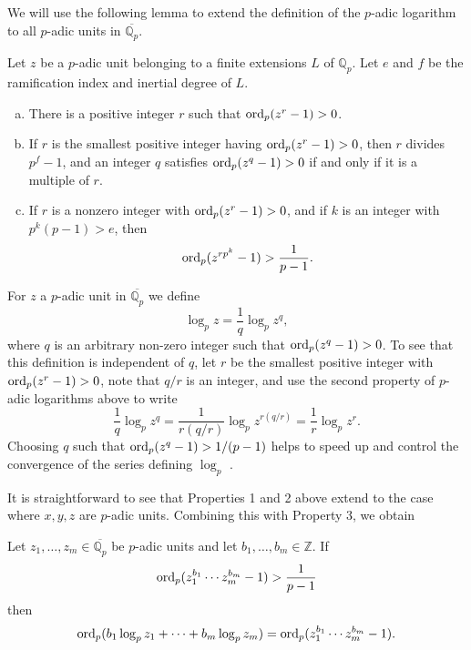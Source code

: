 We will use the following lemma to extend the definition of the $p$-adic logarithm to all $p$-adic units in $\overline{\mathbb{Q}_p}$. 
\begin{lemma} \label{lem: pAdicLogarithms}
Let $z$ be a $p$-adic unit belonging to a finite extensions $L$ of $\mathbb{Q}_p$. Let $e$ and $f$ be the ramification index and inertial degree of $L$. 
\begin{enumerate}[(a)]
\item There is a positive integer $r$ such that $\operatorname{ord}_p(z^r-1) >0$.
\item If $r$ is the smallest positive integer having $\operatorname{ord}_p(z^r-1) >0$, then $r$ divides $p^f-1$, and an integer $q$ satisfies $\operatorname{ord}_p(z^q-1) >0$ if and only if it is a multiple of $r$.
\item If $r$ is a nonzero integer with $\operatorname{ord}_p(z^r-1) >0$, and if $k$ is an integer with $p^k(p-1) > e$, then
\[\operatorname{ord}_p(z^{rp^k}-1) >\frac{1}{p-1}.\]
\end{enumerate}
\end{lemma}

For $z$ a $p$-adic unit in $\overline{\mathbb{Q}_p}$ we define
\[\log_p{z} = \frac{1}{q}\log_p{z^q},\]
where $q$ is an arbitrary non-zero integer such that $\operatorname{ord}_p(z^q-1) >0$. To see that this definition is independent of $q$, let $r$ be the smallest positive integer with $\operatorname{ord}_p(z^r-1) >0$, note that $q/r$ is an integer, and use the second property of $p$-adic logarithms above to write
\[\frac{1}{q}\log_p{z^q} = \frac{1}{r(q/r)}\log_p{z^{r(q/r)}} = \frac{1}{r}\log_p{z^r}.\]
Choosing $q$ such that $\operatorname{ord}_p(z^q-1) > 1/(p-1)$ helps to speed up and control the convergence of the series defining $\log_p$ .

It is straightforward to see that Properties 1 and 2 above extend to the case where $x,y,z$ are $p$-adic units. Combining this with Property 3, we obtain
\begin{lemma}\label{lem:pAdicLogarithms2}
Let $z_1, \dots, z_m \in \overline{\mathbb{Q}_p}$ be $p$-adic units and let $b_1, \dots, b_m \in \mathbb{Z}$. If 
\[\operatorname{ord}_p(z_1^{b_1}\cdots z_m^{b_m} - 1) > \frac{1}{p-1}\]
then 
\[\operatorname{ord}_p(b_1\log_p{z_1} + \cdots + b_m \log_p{z_m}) = \operatorname{ord}_p(z_1^{b_1}\cdots z_m^{b_m} - 1).\]
\end{lemma}


